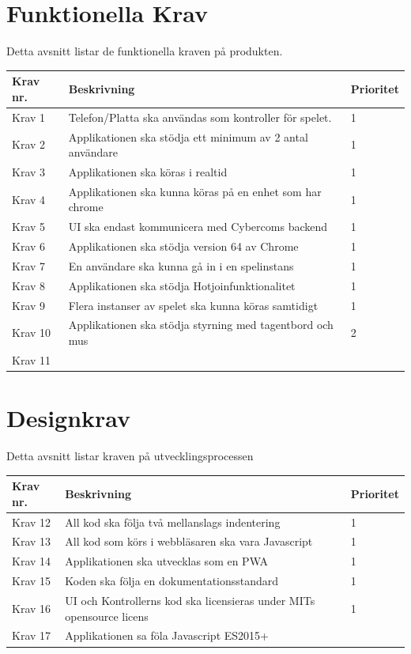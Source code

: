 \documentclass[10pt]{article}
\begin{document}
\pagebreak
\section{Funktionella Krav}
	Detta avsnitt listar de funktionella kraven på produkten.	
	
	\begin{tabular}{| p{2cm} | p{8cm} | p{2cm}|}
		\hline
		
		\textbf{Krav nr.} & \textbf{Beskrivning} &\textbf{Prioritet} \\ \hline
		Krav 1 & Telefon/Platta ska användas som kontroller för spelet. & 1 \\ \hline
		Krav 2 & Applikationen ska stödja ett minimum av 2 antal användare & 1 \\ \hline
		Krav 3 & Applikationen ska köras i realtid & 1 \\ \hline
		Krav 4 & Applikationen ska kunna köras på en enhet som har chrome & 1 \\ \hline
		Krav 5 & UI ska endast kommunicera med Cybercoms backend & 1 \\ \hline
		Krav 6 & Applikationen ska stödja version 64 av Chrome & 1 \\ \hline
		Krav 7 & En användare ska kunna gå in i en spelinstans & 1 \\ \hline
		Krav 8 & Applikationen ska stödja Hotjoinfunktionalitet & 1 \\ \hline
		Krav 9 & Flera instanser av spelet ska kunna köras samtidigt & 1 \\ \hline
		Krav 10 & Applikationen ska stödja styrning med tagentbord och mus & 2 \\ \hline
		Krav 11 & & \\ \hline
		
	\end{tabular}
	
\section{Designkrav}
	Detta avsnitt listar kraven på utvecklingsprocessen
	
	\begin{tabular}{| p{2cm} | p{8cm} | p{2cm}|}
		\hline
		\textbf{Krav nr.} & \textbf{Beskrivning} & \textbf{Prioritet} \\ \hline
		Krav 12 & All kod ska följa två mellanslags indentering & 1\\ \hline
		Krav 13 & All kod som körs i webbläsaren ska vara Javascript & 1 \\ \hline
		Krav 14 & Applikationen ska utvecklas som en PWA & 1 \\ \hline
		Krav 15 & Koden ska följa en dokumentationsstandard & 1 \\ \hline
		Krav 16 & UI och Kontrollerns kod ska licensieras under MITs opensource licens & 1 \\ \hline
		Krav 17 & Applikationen sa föla Javascript ES2015+ \\ \hline
	\end{tabular}
\pagebreak
\end{document}
